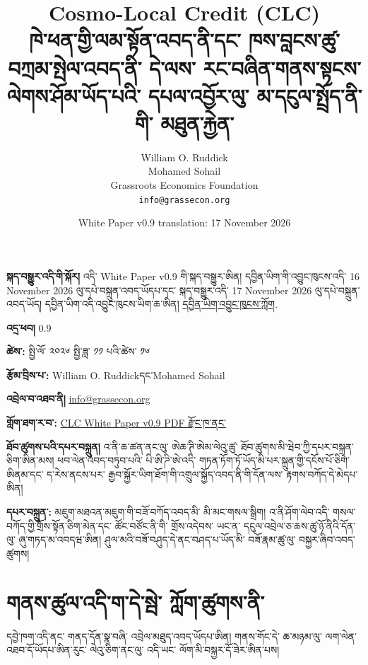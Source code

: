 \documentclass[11pt]{article}
\title{\vspace*{0.85in}Cosmo-Local Credit (CLC)\\ཁེ་ཕན་གྱི་ལམ་སྟོན་འབད་ནི་དང་ ཁས་བླངས་ཚུ་ བཀྲམ་སྤེལ་འབད་ནི་ དེ་ལས་ རང་བཞིན་གནས་སྟངས་ལེགས་ཤོམ་ཡོད་པའི་ དཔལ་འབྱོར་ལུ་ མ་དངུལ་སྤྲོད་ནི་གི་ མཐུན་རྐྱེན་}
\author{William O. Ruddick \\ Mohamed Sohail \\ Grassroots Economics Foundation \\ \texttt{info@grassecon.org}}
\date{White Paper v0.9 translation: 17 November 2026}
\begin{document}
\maketitle
\newpage
\tableofcontents
\newpage
\sloppy
\RaggedRight

\textbf{སྐད་བསྒྱུར་འདི་གི་སྐོར།} འདི་ White Paper v0.9 གི་སྐད་བསྒྱུར་ཨིན། དབྱིན་ཡིག་གི་འབྱུང་ཁུངས་འདི་ 16 November 2026 ལུ་དཔེ་བསྐྲུན་འབད་ཡོདཔ་དང་ སྐད་བསྒྱུར་འདི་ 17 November 2026 ལུ་དཔེ་བསྐྲུན་འབད་ཡོད། དབྱིན་ཡིག་འདི་འབྱུང་ཁུངས་ཡིག་ཆ་ཨིན། \href{https://docs.cosmolocal.credit/white-paper}{དབྱིན་ཡིག་འབྱུང་ཁུངས་ཀློག}.

\textbf{འདྲ་ཕབ།} 0.9

\textbf{ཚེས་:} སྤྱི་ལོ་ ༢༠༢༦ སྤྱི་ཟླ་ ༡༡ པའི་ཚེས་ ༡༦

\textbf{རྩོམ་བྲིས་པ་:} William O. Ruddickདང་Mohamed Sohail

\textbf{འབྲེལ་བ་འཐབ་ནི།} \href{mailto:info@grassecon.org}{info@grassecon.org}

\textbf{གློག་ཐག་ར་བ་:} \href{https://docs.cosmolocal.credit/white-paper/Cosmo-Local-Credit-CLC-White-Paper-v9-dz.pdf}{CLC White Paper v0.9 PDF རྫོང་ཁ་ནང་}

\textbf{ཐོབ་ཚུགས་པའི་དཔར་བསྐྲུན། } འ་ནི་ཆ་ཚན་ནང་ལུ་ ཨེཆ་ཊི་ཨེམ་ལེའུ་ཚུ་ ཐོབ་ཚུགས་མི་ཝེབ་ཀྱི་དཔར་བསྐྲ྄ན་ཅིག་ཨིན་མས། ཕབ་ལེན་འབད་བཏུབ་པའི་ པི་ཨི་ཌི་ཨེ་འདི་ གཏན་ཏོག་ཏོ་ཡོད་མི་པར་སྐྲུན་གྱི་དངོས་པོ་ཅིག་ཨིནམ་དང་ ད་རེས་ནངས་པར་ རྒྱབ་སྐྱོར་ཡིག་ཐོག་གི་འགྲུལ་སྐྱོད་འབད་ནི་གི་དོན་ལས་ རྟགས་བཀོད་དེ་མེདཔ་ཨིན།

\textbf{དཔར་བསྐྲུན་:} མཇུག་མཐའན་མཇུག་གི་བཟོ་བཀོད་འབད་མི་ མི་མང་གསལ་སྒྲིག། འ་ནི་ཤོག་ལེབ་འདི་ གསལ་བཀོད་གྱི་གྲོས་སྟོན་ཅིག་མེན་དང་ ཚོང་བཙོང་ནི་གི་ གྲོས་འདེབས་ ཡང་ན་ དངུལ་འབྲེལ་ཅ་ཆས་ཚུ་ཉོ་ནིའི་དོན་ལུ་ ཞུ་གཏད་མ་འབདཝ་ཨིན། ཤུལ་མའི་བཟོ་བཤུད་དེ་ནང་བཤད་པ་ཡོད་མི་ བཟོ་རྣམ་ཚུ་ལུ་ བསྐྱར་ཞིབ་འབད་ཚུགས།

\section*{གནས་ཚུལ་འདི་ག་དེ་སྦེ་ ཀློག་ཚུགས་ནི་}

དབྱེ་ཁག་འདི་ནང་ གནད་དོན་སྣ་བཞི་ འབྲེལ་མཐུད་འབད་ཡོདཔ་ཨིན། གནས་གོང་དེ་ ཆ་མཉམ་ལུ་ ལག་ལེན་འཐབ་དོ་ཡོདཔ་ཨིན་རུང་ ལེའུ་ཅིག་ནང་ལུ་ འདི་ཡང་ ལོག་མི་བསྐྱར་དོ་ཟེར་ཨིན་པས།
\end{document}
